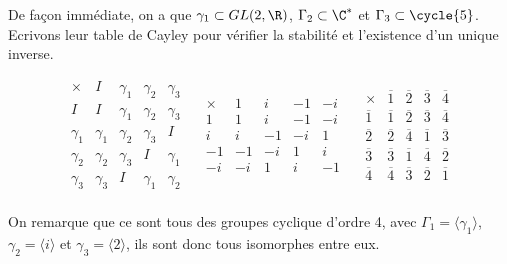 De façon immédiate, on a que $\gamma_1 \subset GL(2, \R )$, $\Gamma_2 \subset \C^*$ et $\Gamma_3 \subset \cycle{5}$. Ecrivons leur table de Cayley pour vérifier la stabilité et l'existence d'un unique inverse.


\[
\begin{array}{c|cccc}
   \times   & I        & \gamma_1 & \gamma_2 & \gamma_3 \\ \hline
   I        & I        & \gamma_1 & \gamma_2 & \gamma_3 \\    
   \gamma_1 & \gamma_1 & \gamma_2 & \gamma_3 & I \\
   \gamma_2 & \gamma_2 & \gamma_3 & I        & \gamma_1 \\
   \gamma_3 & \gamma_3 & I        & \gamma_1 & \gamma_2 \\ 
\end{array}
\quad
\begin{array}{c|cccc}
   \times & 1 & i & -1 & -i \\ \hline
    1     & 1 & i & -1 & -i \\
    i     & i & -1 & -i & 1 \\
    -1    & -1& -i & 1 & i \\
    -i    & -i & 1 & i & -1 \\ 
\end{array}
\quad
\begin{array}{c|cccc}
   \times & \overline{1} & \overline{2} & \overline{3} & \overline{4} \\ \hline
   \overline{1} & \overline{1} & \overline{2} & \overline{3} & \overline{4} \\
   \overline{2} & \overline{2} & \overline{4} & \overline{1} & \overline{3}  \\
   \overline{3} & \overline{3} & \overline{1} & \overline{4} & \overline{2} \\
    \overline{4} & \overline{4} & \overline 3 & \overline 2 & \overline 1 \\ 
\end{array}
\]

On remarque que ce sont tous des groupes cyclique d'ordre 4, avec $\Gamma_1 = \langle \gamma_1 \rangle$,
$\gamma_2 = \langle i \rangle$ et $\gamma_3 = \langle 2 \rangle$, ils sont donc tous isomorphes entre eux.